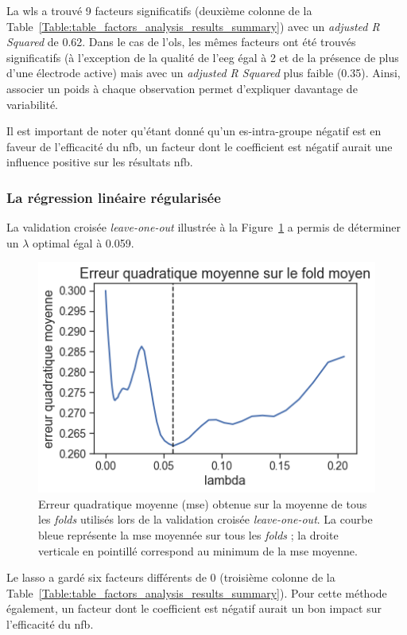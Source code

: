 La \gls{wls} a trouvé 9 facteurs significatifs (deuxième colonne de la Table~\ref{Table:table_factors_analysis_results_summary}) avec un \textit{adjusted R Squared} de 0.62. 
Dans le cas de l'\gls{ols}, les mêmes facteurs ont été trouvés significatifs (à l'exception de la qualité de 
l'\gls{eeg} égal à 2 et de la présence de plus d'une électrode active) mais avec un \textit{adjusted R Squared} plus faible (0.35). Ainsi, associer un poids
à chaque observation permet d'expliquer davantage de variabilité. 

Il est important de noter qu'étant donné qu'un \gls{es}-intra-groupe négatif est en faveur de l'efficacité du \gls{nfb},
un facteur dont le coefficient est négatif aurait une influence positive sur les résultats \gls{nfb}.


\subsubsection{La régression linéaire régularisée}

La validation croisée \textit{leave-one-out} illustrée à la Figure~\ref{Figure:selection_lambda_lasso} a permis de déterminer un $\lambda$ optimal égal à 0.059.
\begin{figure}[h!]
  \centering
	\includegraphics[width=0.7\linewidth]{figures/chapter-3/factors-selection-lasso-best-lambda} 
  \caption{Erreur quadratique moyenne (\gls{mse}) obtenue sur la moyenne de tous les \textit{folds} utilisés lors de la validation 
	croisée \textit{leave-one-out}. La courbe bleue représente la \gls{mse} moyennée sur tous les \textit{folds} ; la droite verticale en pointillé correspond
	au minimum de la \gls{mse} moyenne.}
  \label{Figure:selection_lambda_lasso}
\end{figure}

Le \gls{lasso} a gardé six facteurs différents de 0 (troisième colonne de la Table~\ref{Table:table_factors_analysis_results_summary}). Pour cette méthode également,
un facteur dont le coefficient est négatif aurait un bon impact sur l'efficacité du \gls{nfb}.

